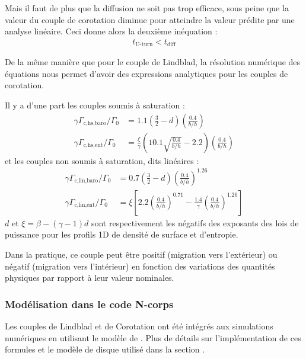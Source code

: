 Mais il faut de plus que la diffusion ne soit pas trop efficace, sous peine que la valeur du couple de corotation diminue pour atteindre la valeur prédite par une analyse linéaire. Ceci donne alors la deuxième inéquation : 
\begin{align}
t_\text{U-turn} < t_\text{diff}
\end{align}

\bigskip

De la même manière que pour le couple de Lindblad, la résolution numérique des équations nous permet d'avoir des expressions analytiques pour les couples de corotation. 

Il y a d'une part les couples soumis à saturation \citep[eq. (45)]{paardekooper2010torque} :
\begin{subequations}
\begin{align}
\gamma \Gamma_\text{c,hs,baro}/\Gamma_0 &= 1.1\left( \frac{3}{2} - d\right)\left(\frac{0.4}{b/h}\right)\\
\gamma \Gamma_\text{c,hs,ent}/\Gamma_0 &= \frac{\xi}{\gamma}\left(10.1\sqrt{\frac{0.4}{b/h}} - 2.2\right)\left(\frac{0.4}{b/h}\right)
\end{align}\label{eq:saturated-corotation-torque}
\end{subequations}
et les couples non soumis à saturation, dits linéaires \citep[eq. (17)]{paardekooper2010torque} :
\begin{subequations}
\begin{align}
\gamma \Gamma_\text{c,lin,baro}/\Gamma_0 &= 0.7\left( \frac{3}{2} - d\right)\left(\frac{0.4}{b/h}\right)^{1.26}\\
\gamma \Gamma_\text{c,lin,ent}/\Gamma_0 &= \xi\left[2.2\left(\frac{0.4}{b/h}\right)^{0.71} - \frac{1.4}{\gamma}\left(\frac{0.4}{b/h}\right)^{1.26}\right]
\end{align}\label{eq:linear-corotation-torque}
\end{subequations}
$d$ et $\xi=\beta - (\gamma-1)d$ sont respectivement les négatifs des exposants des lois de puissance pour les profils 1D de densité de surface et d'entropie.

\bigskip

Dans la pratique, ce couple peut être positif (migration vers l'extérieur) ou négatif (migration vers l'intérieur) en fonction des variations des quantités physiques par rapport à leur valeur nominales.

\subsubsection{Modélisation dans le code N-corps}
Les couples de Lindblad et de Corotation ont été intégrés aux simulations numériques en utilisant le modèle de \cite{paardekooper2011torque}. Plus de détails sur l'implémentation de ces formules et le modèle de disque utilisé dans la section .

